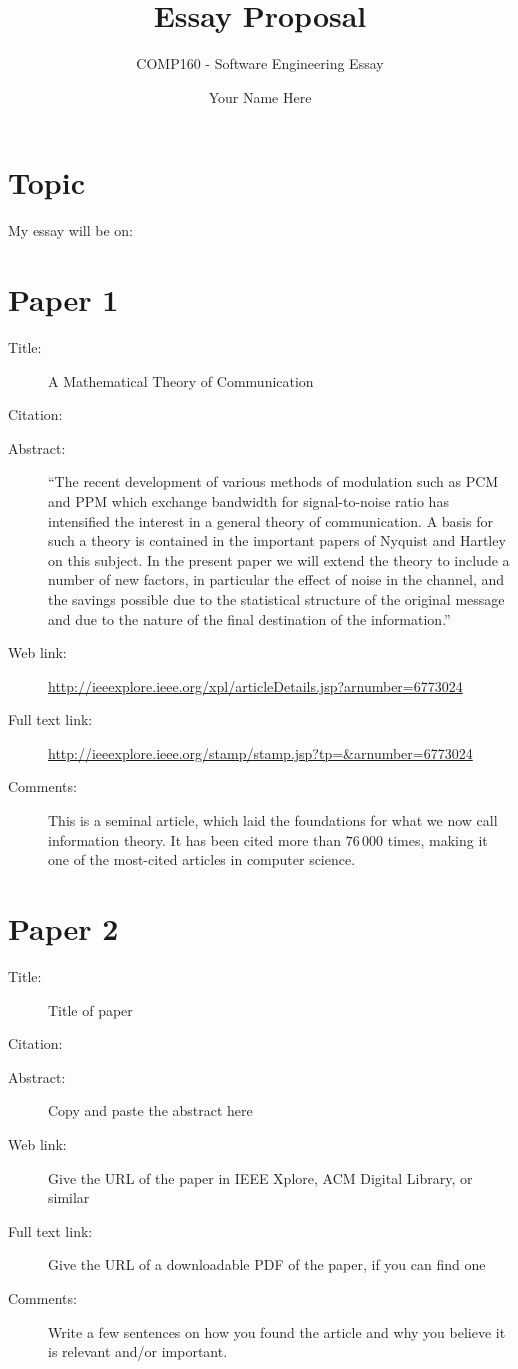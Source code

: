 \documentclass{scrartcl}
\title{Essay Proposal}
\subtitle{COMP160 - Software Engineering Essay}
\author{Your Name Here}
\begin{document}
\maketitle

\section*{Topic}

My essay will be on:


\section*{Paper 1}
\begin{description}
\item[Title:] A Mathematical Theory of Communication
\item[Citation:] \cite{shannon}
\item[Abstract:] ``The recent development of various methods of modulation such as PCM and PPM which exchange bandwidth for signal-to-noise ratio has intensified the interest in a general theory of communication. A basis for such a theory is contained in the important papers of Nyquist and Hartley on this subject. In the present paper we will extend the theory to include a number of new factors, in particular the effect of noise in the channel, and the savings possible due to the statistical structure of the original message and due to the nature of the final destination of the information.''
\item[Web link:] \url{http://ieeexplore.ieee.org/xpl/articleDetails.jsp?arnumber=6773024}
\item[Full text link:] \url{http://ieeexplore.ieee.org/stamp/stamp.jsp?tp=&arnumber=6773024}
\item[Comments:] This is a seminal article, which laid the foundations for what we now call information theory.
	It has been cited more than $76\,000$ times, making it one of the most-cited articles in computer science.
\end{description}

\section*{Paper 2}
\begin{description}
\item[Title:] Title of paper
\item[Citation:] \cite{bibtex_key}
\item[Abstract:] Copy and paste the abstract here
\item[Web link:] Give the URL of the paper in IEEE Xplore, ACM Digital Library, or similar
\item[Full text link:] Give the URL of a downloadable PDF of the paper, if you can find one
\item[Comments:] Write a few sentences on how you found the article and why you believe it is relevant and/or important.
\end{description}
\end{document}
